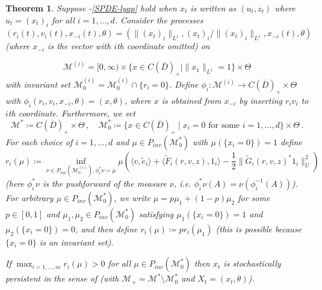 \documentclass[final]{amsart}
\newtheorem{thm}{Theorem}
\numberwithin{thm}{section}
\numberwithin{equation}{section}
\newcommand{\mcM}{\mathcal{M}}
\newcommand{\inv}{\mathcal{M}_+}
\newcommand{\ip}[2]{\langle #1, #2 \rangle}
\newcommand{\cdom}{C(\overline D)_+}
\begin{document}
\begin{thm}\label{main-SPDE-thm-2}
    Suppose -\ref{SPDE-lyap} hold when $x_t$ is written as $(u_t,z_t)$ where $u_t = (x_t)_i$ for all $i = 1,\dots,d$. Consider the processes 
    $(r_i(t),v_i(t),x_{-i}(t),\theta) = (\|(x_t)_i\|_{L^1}, (x_t)_i/\|(x_t)_i\|_{L^1}, x_{-i}(t),\theta)$ (where $x_{-i}$ is the vector with $i$th coordinate omitted) on
    
    $$
    \mcM^{(i)} = [0,\infty) \times \{x \in \cdom \mid \|x_1\|_{L^1} = 1\} \times \Theta
    $$
    with invariant set $\mcM_0^{(i)} = \mcM_0^{(i)} \cap \{r_i = 0\}$. 
    Define  $\phi_i: \mcM^{(i)} \to \cdom \times \Theta$ with $\phi_i(r_i,v_i,x_{-i},\theta) = (x,\theta)$, where $x$ is obtained from  $x_{-i}$ by inserting $r_iv_i$ to $i$th coordinate. Furthermore, we set
    $$\mcM^* \coloneqq \cdom \times \Theta \,, \quad \mcM_0^* \coloneqq \{x \in \cdom \mid x_i = 0 \text{ for some } i=1,\dots,d\} \times \Theta \,.$$
    For each choice of $i=1,\dots,d$ and $\mu \in P_{inv}(\mcM_0^*)$ with $\mu(\{x_i = 0\}) = 1$ define
    \begin{equation}\label{eq:inv-rates-general}
        r_i(\mu) \coloneqq \inf_{\nu \in P_{inv}(\mcM_0^{(i)}), \phi_i^*\nu = \mu} \mu (\ip{v}{\tilde e_i} + \ip{\tilde F_i(r,v,z)}{1_i} - \frac{1}{2}\|\tilde G_i(r,v,z)^*1_i\|_U^2)
    \end{equation}
    (here $\phi_i^*\nu$ is the pushforward of the measure $\nu$, i.e. $\phi_i^*\nu(A) = \nu(\phi_i^{-1}(A))$). For arbitrary $\mu \in P_{inv}(\mcM_0^*)$, we write $\mu = p\mu_1 + (1-p)\mu_2$ for some $p \in [0,1]$ and $\mu_1,\mu_2 \in P_{inv}(\mcM_0^*)$ satisfying $\mu_1(\{x_i = 0\}) = 1$ and $\mu_2(\{x_i = 0\}) = 0$, and then define $r_i(\mu) \coloneqq pr_i(\mu_1)$ (this is possible because $\{x_i = 0\}$ is an invariant set).

    
    If $\max_{i = 1,\dots,m} r_i(\mu) > 0$ for all $\mu \in P_{inv}(\mcM_0^*)$ then $x_t$ is stochastically persistent in the sense of  (with $\inv = \mcM^* \setminus \mcM_0^*$ and $X_t = (x_t,\theta)$).
\end{thm}
\end{document}
